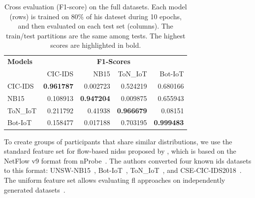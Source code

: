 \begin{table}[t]
    \centering
    \caption{Cross evaluation (F1-score) on the full datasets.
    Each model (rows) is trained on 80\% of his dateset during 10 epochs, and then evaluated on each test set (columns).
    The train/test partitions are the same among tests.
    The highest scores are highlighted in bold.
    \label{tbl:popoola_cross}}
    \bigskip
    \setlength\tabcolsep{1ex}

    \begin{tabular}{l|rrrr}
        \toprule %
        \textbf{Models} & \multicolumn{4}{c}{\textbf{F1-Scores}} \\
                        & CIC-IDS & NB15 & ToN\_IoT & Bot-IoT \\
        \midrule %
          CIC-IDS & \textbf{0.961787} &    0.002723 &  0.524219 &  0.680166 \\
          NB15 & 0.108913 &    \textbf{0.947204} &  0.009875 &  0.655943 \\
          ToN\_IoT & 0.211792 &     0.41938 &  \textbf{0.966679} &   0.08151 \\
          Bot-IoT & 0.158477 &    0.017188 &  0.703195 &  \textbf{0.999483} \\
        \bottomrule %
    \end{tabular}
\end{table}

To create groups of participants that share similar distributions, we use the standard feature set for flow-based \glspl{nids} proposed by \citet{sarhan_standardfeatureset_2021}, which is based on the NetFlow v9 format from nProbe~\cite{nprobe}.
The authors converted four known \gls{ids} datasets to this format: UNSW-NB15~\cite{moustafa_unsw-nb15_2015}, Bot-IoT~\cite{koroniotis_towards_2019}, ToN\_IoT~\cite{moustafa_federatedtoniot_2020}, and CSE-CIC-IDS2018~\cite{sharafaldin_toward_2018}.
The uniform feature set allows evaluating \gls{fl} approaches on independently generated datasets~\cite{popoola_federated_2021,de_carvalho_bertoli_generalizing_2023}.


